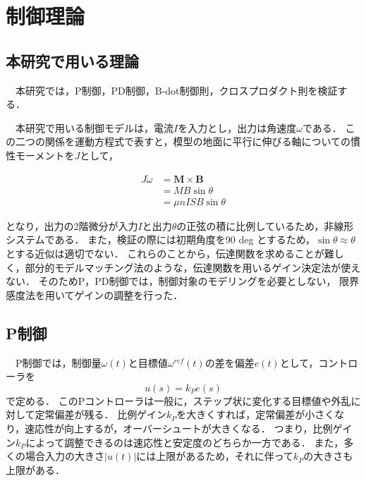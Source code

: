 \section{制御理論}

\subsection{本研究で用いる理論}
　本研究では，P制御，PD制御，B-dot制御則，クロスプロダクト則を検証する．

　本研究で用いる制御モデルは，電流$I$を入力とし，出力は角速度$\omega$である．
この二つの関係を運動方程式で表すと，模型の地面に平行に伸びる軸についての慣性モーメントを$J$として，

\begin{equation}
    \begin{aligned}
        J\dot{\omega} &= \boldsymbol{M \times B}\\
                       &= MB\sin\theta\\
                       &= \mu nISB\sin\theta
    \end{aligned}
\end{equation}

となり，出力の2階微分が入力$I$と出力$\theta$の正弦の積に比例しているため，非線形システムである．
また，検証の際には初期角度を90 deg とするため，$\sin \theta\approx\theta$とする近似は適切でない．
これらのことから，伝達関数を求めることが難しく，部分的モデルマッチング法のような，伝達関数を用いるゲイン決定法が使えない．
そのためP，PD制御では，制御対象のモデリングを必要としない，
限界感度法を用いてゲインの調整を行った．



\subsection{P制御}

　P制御では，制御量$\omega(t)$と目標値$\omega^{ref}(t)$の差を偏差$e(t)$として，コントローラを
\begin{equation}
    u(s) = k_Pe(s)
\end{equation}
で定める．
このPコントローラは一般に，ステップ状に変化する目標値や外乱に対して定常偏差が残る．
比例ゲイン$k_P$を大きくすれば，定常偏差が小さくなり，速応性が向上するが，オーバーシュートが大きくなる．
つまり，比例ゲイン$k_P$によって調整できるのは速応性と安定度のどちらか一方である．
また，多くの場合入力の大きさ$|u(t)|$には上限があるため，それに伴って$k_P$の大きさも上限がある\cite{kawata}．


